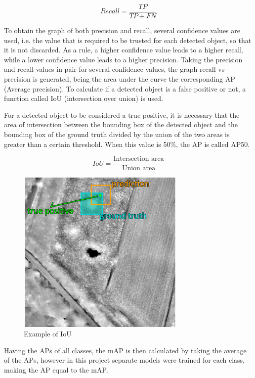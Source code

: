 \begin{equation}
     Recall = \frac{TP }{TP + FN}
\end{equation}

To obtain the graph of both precision and recall, several confidence values are used, i.e. the value that is required to be trusted for each detected object, so that it is not discarded. As a rule, a higher confidence value leads to a higher recall, while a lower confidence value leads to a higher precision. Taking the precision and recall values in pair for several confidence values, the graph recall vs precision is generated, being the area under the curve the corresponding AP (Average precision). To calculate if a detected object is a false positive or not, a function called IoU (intersection over union) is used.

For a detected object to be considered a true positive, it is necessary that the area of intersection between the bounding box of the detected object and the bounding box of the ground truth divided by the union of the two areas is greater than a certain threshold. When this value is 50\%, the AP is called AP50.

\begin{equation}
     IoU = \frac{\text{Intersection area}}{\text{Union area}}
\end{equation}

\begin{figure}[H]
\centering
\includegraphics[height=8cm]{images/IOU.png}
\caption{Example of IoU \cite{Deep Learning for Archaeological Object Detection on LiDAR:
New Evaluation Measures and Insights}}
\end{figure}

Having the APs of all classes, the mAP is then calculated by taking the average of the APs, however in this project separate models were trained for each class, making the AP equal to the mAP.


